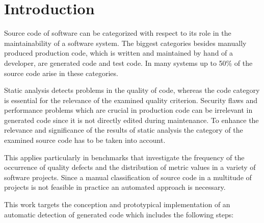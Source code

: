 
\chapter{Introduction}\label{chapter:introduction}

Source code of software can be categorized with respect to its role in the maintainability of a software system. The biggest categories besides manually produced production code, which is written and maintained by hand of a developer, are generated code and test code. In many systems up to 50\% of the source code arise in these categories.

Static analysis detects problems in the quality of code, whereas the code category is essential for the relevance of the examined quality criterion. Security flaws and performance problems which are crucial in production code can be irrelevant in generated code since it is not directly edited during maintenance. To enhance the relevance and significance of the results of static analysis the category of the examined source code has to be taken into account.

This applies particularly in benchmarks that investigate the frequency of the occurrence of quality defects and the distribution of metric values in a variety of software projects. Since a manual classification of source code in a multitude of projects is not feasible in practice an automated approach is necessary.

This work targets the conception and prototypical implementation of an automatic detection of generated code which includes the following steps:

